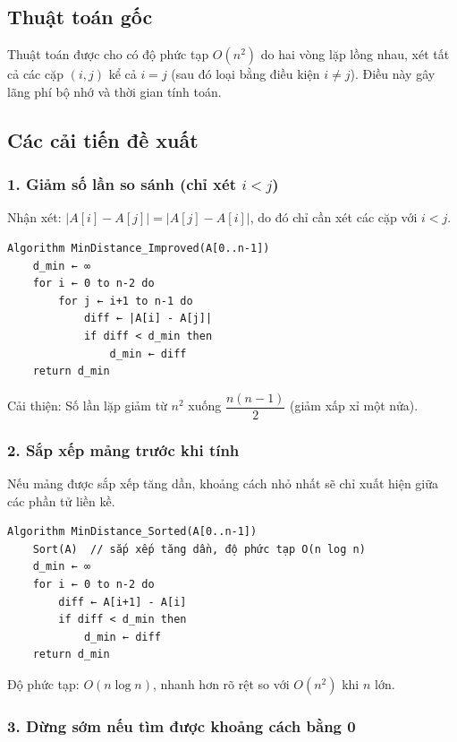 \documentclass[12pt,a4paper]{article}
\begin{document}
\subsection*{Thuật toán gốc}

Thuật toán được cho có độ phức tạp $O(n^2)$ do hai vòng lặp lồng nhau, xét tất cả các cặp $(i, j)$ kể cả $i = j$ (sau đó loại bằng điều kiện $i \neq j$). Điều này gây lãng phí bộ nhớ và thời gian tính toán.

\subsection*{Các cải tiến đề xuất}

\subsubsection*{1. Giảm số lần so sánh (chỉ xét $i < j$)}

Nhận xét: $|A[i] - A[j]| = |A[j] - A[i]|$, do đó chỉ cần xét các cặp với $i < j$.

\begin{lstlisting}
Algorithm MinDistance_Improved(A[0..n-1])
    d_min ← ∞
    for i ← 0 to n-2 do
        for j ← i+1 to n-1 do
            diff ← |A[i] - A[j]|
            if diff < d_min then
                d_min ← diff
    return d_min
\end{lstlisting}

Cải thiện: Số lần lặp giảm từ $n^2$ xuống $\dfrac{n(n-1)}{2}$ (giảm xấp xỉ một nửa).

\subsubsection*{2. Sắp xếp mảng trước khi tính}

Nếu mảng được sắp xếp tăng dần, khoảng cách nhỏ nhất sẽ chỉ xuất hiện giữa các phần tử liền kề.

\begin{lstlisting}
Algorithm MinDistance_Sorted(A[0..n-1])
    Sort(A)  // sắp xếp tăng dần, độ phức tạp O(n log n)
    d_min ← ∞
    for i ← 0 to n-2 do
        diff ← A[i+1] - A[i]
        if diff < d_min then
            d_min ← diff
    return d_min
\end{lstlisting}

Độ phức tạp: $O(n \log n)$, nhanh hơn rõ rệt so với $O(n^2)$ khi $n$ lớn.

\subsubsection*{3. Dừng sớm nếu tìm được khoảng cách bằng 0}
\end{document}

